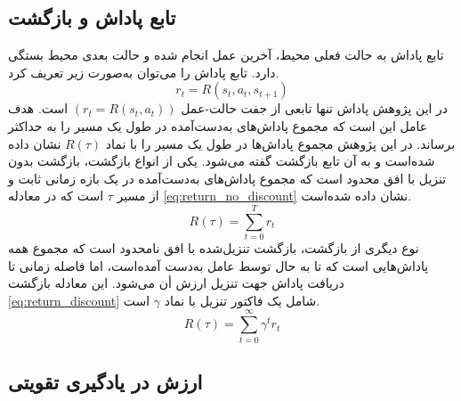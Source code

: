   
\subsection{تابع پاداش و بازگشت}
تابع پاداش به حالت فعلی محیط، آخرین عمل انجام شده و حالت بعدی محیط بستگی دارد. تابع پاداش را می‌توان به‌صورت زیر تعریف کرد.
\begin{equation}
	r_t = R(s_t, a_t, s_{t+1})
\end{equation}
در این پژوهش پاداش تنها تابعی از جفت حالت-عمل \((r_t = R(s_t, a_t))\) است.
هدف عامل این است که مجموع پاداش‌های به‌دست‌آمده در طول یک مسیر را به حداکثر برساند. در این پژوهش مجموع پاداش‌ها در طول یک مسیر را با نماد \(R(\tau)\) نشان داده‌ شده‌است و به آن تابع بازگشت
 گفته می‌شود.
یکی از انواع بازگشت، بازگشت بدون تنزیل با افق محدود
 است که مجموع پاداش‌های به‌دست‌آمده در یک بازه زمانی ثابت و از مسیر
 \(\tau\)
  است که در معادله 
  \eqref{eq:return_no_discount}
  نشان داده شده‌است.
 \begin{equation}
 	R(\tau) = \sum_{t = 0}^T r_t
 	\label{eq:return_no_discount}
 \end{equation}
نوع دیگری از بازگشت، بازگشت تنزیل‌شده با افق نامحدود
 است که مجموع همه پاداش‌هایی است که تا به حال توسط عامل به‌دست آمده‌است، اما فاصله زمانی تا دریافت پاداش جهت تنزیل ارزش أن می‌شود. این معادله بازگشت \eqref{eq:return_discount} شامل یک فاکتور تنزیل
   با نماد \(\gamma\) است.
    \begin{equation}
   	R(\tau) = \sum_{t = 0}^{\infty} \gamma^t r_t
   	\label{eq:return_discount}
   \end{equation}
   
   
   
 \subsection{ ارزش در یادگیری تقویتی}
   
